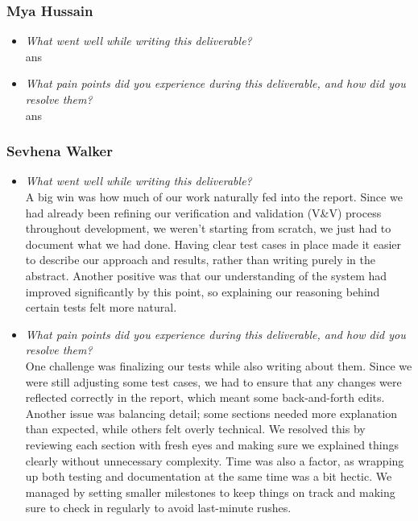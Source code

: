 \documentclass[12pt, titlepage]{article}
\begin{document}
\subsubsection*{Mya Hussain}
\begin{itemize}
  \item \textit{What went well while writing this deliverable?} \\ 
  
  ans

  \item \textit{What pain points did you experience during this deliverable, and how did you resolve them?}\\ 
  
  ans
\end{itemize}

\subsubsection*{Sevhena Walker}
\begin{itemize}
  \item \textit{What went well while writing this deliverable?} \\ 
  
  A big win was how much of our work naturally fed into the report. Since we had already been refining our verification and validation (V\&V) process throughout development, we weren’t starting from scratch, we just had to document what we had done. Having clear test cases in place made it easier to describe our approach and results, rather than writing purely in the abstract. Another positive was that our understanding of the system had improved significantly by this point, so explaining our reasoning behind certain tests felt more natural.

  \item \textit{What pain points did you experience during this deliverable, and how did you resolve them?}\\ 
  
  One challenge was finalizing our tests while also writing about them. Since we were still adjusting some test cases, we had to ensure that any changes were reflected correctly in the report, which meant some back-and-forth edits. Another issue was balancing detail; some sections needed more explanation than expected, while others felt overly technical. We resolved this by reviewing each section with fresh eyes and making sure we explained things clearly without unnecessary complexity. Time was also a factor, as wrapping up both testing and documentation at the same time was a bit hectic. We managed by setting smaller milestones to keep things on track and making sure to check in regularly to avoid last-minute rushes.
\end{itemize}
\end{document}
